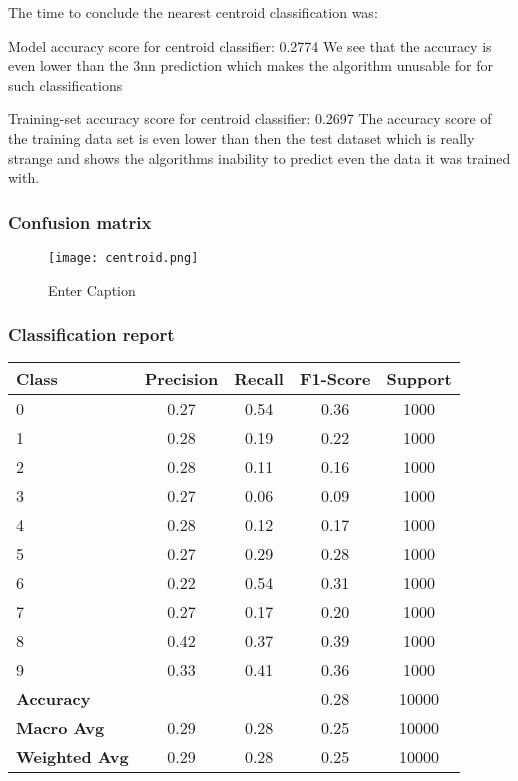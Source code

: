 \documentclass{article}
\begin{document}
The time to conclude the nearest centroid classification was: 

Model accuracy score for centroid classifier: 0.2774
We see that the accuracy is even lower than the 3nn prediction which makes the algorithm unusable for for such classifications 

Training-set accuracy score for centroid classifier: 0.2697
The accuracy score of the training data set is even lower than then the test dataset which is really strange and shows the algorithms inability to predict even the data it was trained with.

\subsubsection{Confusion matrix}
\begin{figure}[h!]
    \centering
    \texttt{[image: centroid.png]}
    \caption{Enter Caption}
    \label{fig:enter-label}
\end{figure}

\subsubsection{Classification report}

\begin{tabular}{lcccc}
\toprule
\textbf{Class} & \textbf{Precision} & \textbf{Recall} & \textbf{F1-Score} & \textbf{Support} \\
\midrule
0 & 0.27 & 0.54 & 0.36 & 1000 \\
1 & 0.28 & 0.19 & 0.22 & 1000 \\
2 & 0.28 & 0.11 & 0.16 & 1000 \\
3 & 0.27 & 0.06 & 0.09 & 1000 \\
4 & 0.28 & 0.12 & 0.17 & 1000 \\
5 & 0.27 & 0.29 & 0.28 & 1000 \\
6 & 0.22 & 0.54 & 0.31 & 1000 \\
7 & 0.27 & 0.17 & 0.20 & 1000 \\
8 & 0.42 & 0.37 & 0.39 & 1000 \\
9 & 0.33 & 0.41 & 0.36 & 1000 \\
\midrule
\textbf{Accuracy} & & &   0.28 & 10000 \\
\textbf{Macro Avg} & 0.29       & 0.28 & 0.25  & 10000 \\
\textbf{Weighted Avg} & 0.29 &  0.28 &  0.25 & 10000 \\
\bottomrule

\end{tabular}
\end{document}
